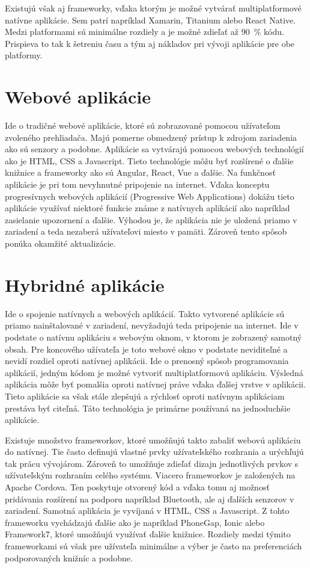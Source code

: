 Existujú však aj frameworky, vďaka ktorým je možné vytvárať multiplatformové natívne aplikácie. Sem patrí napríklad Xamarin, Titanium alebo React Native. Medzi platformami sú minimálne rozdiely a je možné zdieľať až 90~\% kódu. Prispieva to tak k šetreniu času a tým aj nákladov pri vývoji aplikácie pre obe platformy.\cite{crossplatform-app}

\section{Webové aplikácie}

Ide o tradičné webové aplikácie, ktoré sú zobrazované pomocou užívateľom zvoleného prehliadača. Majú pomerne obmedzený prístup k zdrojom zariadenia ako sú senzory a podobne. Aplikácie sa vytvárajú pomocou webových technológií ako je HTML, CSS a Javascript. Tieto technológie môžu byť rozšírené o ďalšie knižnice a frameworky ako sú Angular, React, Vue a ďalšie. Na funkčnosť aplikácie je pri tom nevyhnutné pripojenie na internet. Vďaka konceptu progresívnych webových aplikácií (Progressive Web Applications) dokážu tieto aplikácie využívať niektoré funkcie známe z natívnych aplikácií ako napríklad zasielanie upozornení a ďalšie. Výhodou je, že aplikácia nie je uložená priamo v zariadení a teda nezaberá užívateľovi miesto v pamäti. Zároveň tento spôsob ponúka okamžité aktualizácie.\cite{hybrid-app} 

\section{Hybridné aplikácie}

Ide o spojenie natívnych a webových aplikácií. Takto vytvorené aplikácie sú priamo nainštalované v zariadení, nevyžadujú teda pripojenie na internet. Ide v podstate o natívnu aplikáciu s webovým oknom, v ktorom je zobrazený samotný obsah. Pre koncového užívateľa je toto webové okno v podstate neviditeľné a nevidí rozdiel oproti natívnej aplikácii. Ide o prenosný spôsob programovania aplikácií, jedným kódom je možné vytvoriť multiplatformovú aplikáciu. Výsledná aplikácia môže byť pomalšia oproti natívnej práve vďaka ďalšej vrstve v aplikácii. Tieto aplikácie sa však stále zlepšujú a rýchlosť oproti natívnym aplikáciam prestáva byť citeľná. Táto technológia je primárne používaná na jednoduchšie aplikácie.\cite{hybrid-app} 

Existuje množstvo frameworkov, ktoré umožňujú takto zabaliť webovú aplikáciu do natívnej. Tie často definujú vlastné prvky užívateľského rozhrania a urýchľujú tak prácu vývojárom. Zároveň to umožňuje zdieľať dizajn jednotlivých prvkov s užívateľským rozhraním celého systému. Viacero frameworkov je založených na Apache Cordova. Ten poskytuje otvorený kód a vďaka tomu aj možnosť pridávania rozšírení na podporu napríklad Bluetooth, ale aj ďalších senzorov v zariadení. Samotná aplikácia je vyvíjaná v HTML, CSS a Javascript. Z tohto frameworku vychádzajú ďalšie ako je napríklad PhoneGap, Ionic alebo Framework7, ktoré umožňujú využívať ďalšie knižnice. Rozdiely medzi týmito frameworkami sú však pre užívateľa minimálne a výber je často na preferenciách podporovaných knižníc a podobne.\cite{crossplatform-app}


